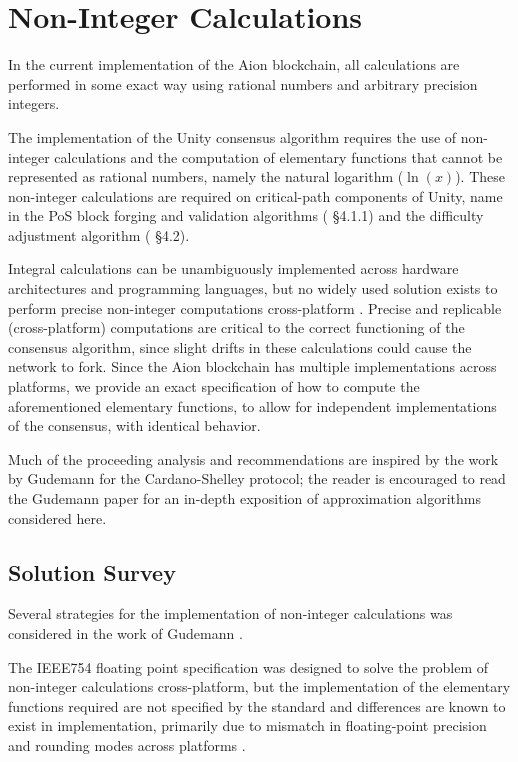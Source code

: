 \section{Non-Integer Calculations}
In the current implementation of the Aion blockchain, all calculations are performed in some exact way using rational numbers and arbitrary precision integers.

The implementation of the Unity consensus algorithm requires the use of non-integer calculations and the computation of elementary functions that cannot be represented as rational numbers, namely the natural logarithm ($\ln(x)$). These non-integer calculations are required on critical-path components of Unity, name in the PoS block forging and validation algorithms (\cite{WZS19} \S4.1.1) and the difficulty adjustment algorithm (\cite{WZS19} \S4.2).

Integral calculations can be unambiguously implemented across hardware architectures and programming languages, but no widely used solution exists to perform precise non-integer computations cross-platform \cite{Izm19}. Precise and replicable (cross-platform) computations are critical to the correct functioning of the consensus algorithm, since slight drifts in these calculations could cause the network to fork. Since the Aion blockchain has multiple implementations  across platforms, we provide an exact specification of how to compute the aforementioned elementary functions, to allow for independent implementations of the consensus, with identical behavior.

Much of the proceeding analysis and recommendations are inspired by the work by Gudemann \cite{Gud19} for the Cardano-Shelley protocol; the reader is encouraged to read the Gudemann paper for an in-depth exposition of approximation algorithms considered here.

\subsection{Solution Survey}
Several strategies for the implementation of non-integer calculations was considered in the work of Gudemann \cite{Gud19}. 

The IEEE754 floating point specification was designed to solve the problem of non-integer calculations cross-platform, but the implementation of the elementary functions required are not specified by the standard and differences are known to exist in implementation, primarily due to mismatch in floating-point precision and rounding modes across platforms \cite{Obi06}. 

